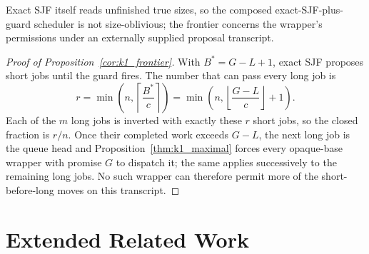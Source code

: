 \documentclass[mathematics,supfile,submit,moreauthors]{Definitions/mdpi}
\begin{document}
Exact SJF itself reads unfinished true sizes, so the composed exact-SJF-plus-guard
scheduler is not size-oblivious; the frontier concerns the wrapper's permissions
under an externally supplied proposal transcript.

\begin{proof}[Proof of Proposition~\ref{cor:k1_frontier}]
With $B^*=G-L+1$, exact SJF proposes short jobs until the guard fires. The number
that can pass every long job is
\[
 r=\min\!\left(n,\left\lceil\frac{B^*}{c}\right\rceil\right)
  =\min\!\left(n,\left\lfloor\frac{G-L}{c}\right\rfloor+1\right).
\]
Each of the $m$ long jobs is inverted with exactly these $r$ short jobs, so the
closed fraction is $r/n$. Once their completed work exceeds $G-L$, the next long
job is the queue head and Proposition~\ref{thm:k1_maximal} forces every opaque-base
wrapper with promise $G$ to dispatch it; the same applies successively to the
remaining long jobs. No such wrapper can therefore permit more of the
short-before-long moves on this transcript.
\end{proof}



\section{Extended Related Work}
\label{sec:supp_related}
\end{document}
